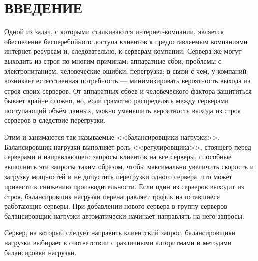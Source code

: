 \section*{ВВЕДЕНИЕ}

Одной из задач, с которыми сталкиваются интернет-компании, является обеспечение бесперебойного доступа клиентов к предоставляемым компаниями интернет-ресурсам и, следовательно, к серверам компании.
Сервера же могут выходить из строя по многим причинам: аппаратные сбои, проблемы с электропитанием, человеческие ошибки, перегрузка; в связи с чем, у компаний возникает естесственная потребность --- минимизировать вероятность выхода из строя своих серверов.
От аппаратных сбоев и человеческого фактора защититься бывает крайне сложно, но, если грамотно распределять между серверами поступающий объём данных, можно уменьшить вероятность выхода из строя серверов в следствие перегрузки.

Этим и занимаются так называемые <<балансировщики нагрузки>>.
Балансировщик нагрузки выполняет роль <<регулировщика>>, стоящего перед серверами и направляющего запросы клиентов на все серверы, способные выполнить эти запросы таким образом, чтобы максимально увеличить скорость и загрузку мощностей и не допустить перегрузки одного сервера, что может привести к снижению производительности.
Если один из серверов выходит из строя, балансировщик нагрузки перенаправляет трафик на оставшиеся работающие серверы.
При добавлении нового сервера в группу серверов балансировщик нагрузки автоматически начинает направлять на него запросы.~\cite{nginx}

Сервер, на который следует направить клиентский запрос, балансировщики нагрузки выбирает в соответствии с различными алгоритмами и методами балансировки нагрузки.

